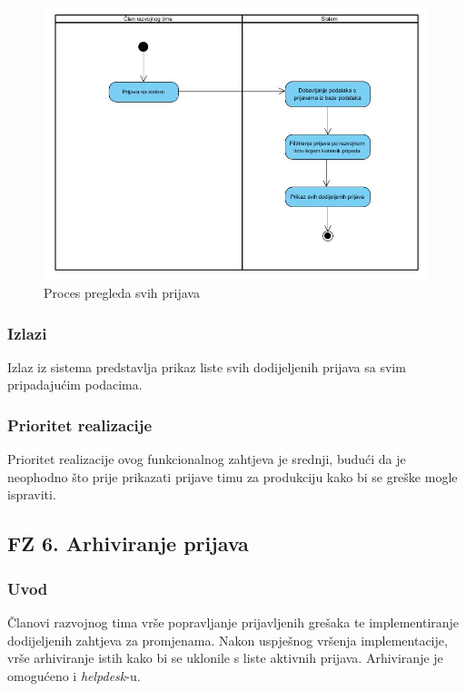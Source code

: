 \documentclass[12pt,a4paper]{article}
\begin{document}
\begin{figure}[H]
\center
\includegraphics[scale=0.5]{../res/Activity/activity5.JPG}
\caption{Proces pregleda svih prijava}
\label{act5}
\end{figure}

\subsubsection{Izlazi}

Izlaz iz sistema predstavlja prikaz liste svih dodijeljenih prijava sa svim pripadajućim podacima.

\subsubsection{Prioritet realizacije}

Prioritet realizacije ovog funkcionalnog zahtjeva je srednji, budući da je neophodno što prije prikazati prijave timu za produkciju kako bi se greške mogle ispraviti.

\subsection{FZ 6. Arhiviranje prijava}

\subsubsection{Uvod}

Članovi razvojnog tima vrše popravljanje prijavljenih grešaka te implementiranje dodijeljenih zahtjeva za promjenama. Nakon uspješnog vršenja implementacije, vrše arhiviranje istih kako bi se uklonile s liste aktivnih prijava. Arhiviranje je omogućeno i \textit{helpdesk}-u.
\end{document}
